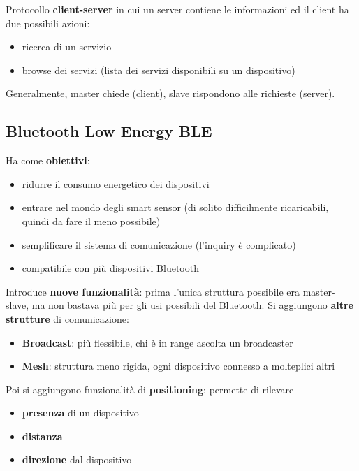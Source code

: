 Protocollo \textbf{client-server} in cui un server contiene le informazioni ed il client ha due possibili azioni:
\begin{itemize}
	\item ricerca di un servizio
	
    \item browse dei servizi (lista dei servizi disponibili su un dispositivo)
\end{itemize}
Generalmente, master chiede (client), slave rispondono alle richieste (server).

\subsection{Bluetooth Low Energy BLE}

Ha come \textbf{obiettivi}:
\begin{itemize}
	\item ridurre il consumo energetico dei dispositivi
	
    \item entrare nel mondo degli smart sensor (di solito difficilmente ricaricabili, quindi da fare il meno possibile)
	
    \item semplificare il sistema di comunicazione (l'inquiry è complicato)
	
    \item compatibile con più dispositivi Bluetooth
\end{itemize} 

Introduce \textbf{nuove funzionalità}: prima l'unica struttura possibile era master-slave, ma non bastava più per gli usi possibili del Bluetooth. Si aggiungono \textbf{altre strutture} di comunicazione:
\begin{itemize}
	\item \textbf{Broadcast}: più flessibile, chi è in range ascolta un broadcaster
	
    \item \textbf{Mesh}: struttura meno rigida, ogni dispositivo connesso a molteplici altri
\end{itemize}

Poi si aggiungono funzionalità di \textbf{positioning}: permette di rilevare
\begin{itemize}
	\item \textbf{presenza} di un dispositivo
	
    \item \textbf{distanza}
	
    \item \textbf{direzione} dal dispositivo
\end{itemize}


